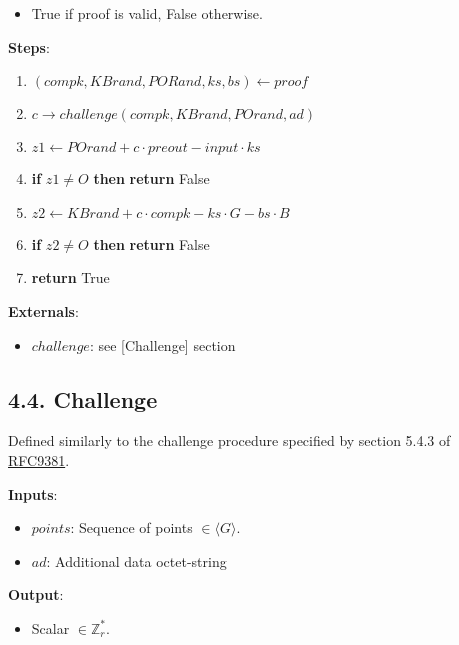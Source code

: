 \documentclass[
]{article}
\providecommand{\tightlist}{%
  \setlength{\itemsep}{0pt}\setlength{\parskip}{0pt}}
\begin{document}
\begin{itemize}
\tightlist
\item
  True if proof is valid, False otherwise.
\end{itemize}

\textbf{Steps}:

\begin{enumerate}
\def\labelenumi{\arabic{enumi}.}
\tightlist
\item
  \((compk, KBrand, PORand, ks, bs) \leftarrow proof\)
\item
  \(c \rightarrow challenge(compk, KBrand, POrand, ad)\)
\item
  \(z1 \leftarrow POrand + c \cdot preout - input \cdot ks\)
\item
  \textbf{if} \(z1 \neq O\) \textbf{then} \textbf{return} False
\item
  \(z2 \leftarrow KBrand + c \cdot compk - ks \cdot G - bs \cdot B\)
\item
  \textbf{if} \(z2 \neq O\) \textbf{then} \textbf{return} False
\item
  \textbf{return} True
\end{enumerate}

\textbf{Externals}:

\begin{itemize}
\tightlist
\item
  \(challenge\): see {[}Challenge{]} section
\end{itemize}

\hypertarget{challenge}{%
\subsection{4.4. Challenge}\label{challenge}}

Defined similarly to the challenge procedure specified by section 5.4.3
of \href{https://datatracker.ietf.org/doc/rfc9381/}{RFC9381}.

\textbf{Inputs}:

\begin{itemize}
\tightlist
\item
  \(points\): Sequence of points \(\in \langle G \rangle\).
\item
  \(ad\): Additional data octet-string
\end{itemize}

\textbf{Output}:

\begin{itemize}
\tightlist
\item
  Scalar \(\in \mathbb{Z}^*_r\).
\end{itemize}
\end{document}

